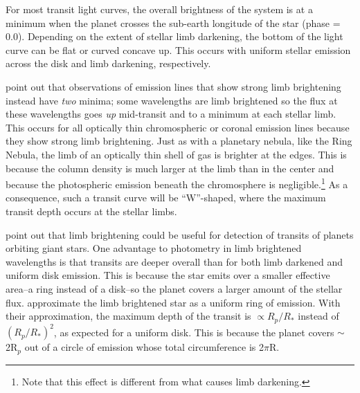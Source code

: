 \documentclass[twocolumn]{emulateapj}
\begin{document}
For most transit light curves, the overall brightness of the system is at a minimum when the planet crosses the sub-earth longitude of the star (phase = 0.0). Depending on the extent of stellar limb darkening, the bottom of the light curve can be flat or curved concave up. This occurs with uniform stellar emission across the disk and limb darkening, respectively.
%

\citet{assef} point out that observations of emission lines that show strong limb brightening instead have {\it two} minima; some
wavelengths are limb brightened so the flux at these wavelengths goes
{\it up} mid-transit and to a minimum at each stellar limb. This occurs for all optically thin
chromospheric or coronal emission lines because they show strong limb brightening. Just as with a planetary
nebula, like the Ring Nebula, the limb of an optically thin shell of
gas is brighter at the edges. This is because the column density is much larger at the limb than in the center and because the photospheric emission beneath the chromosphere is negligible.\footnote{Note
that this effect is different from what causes limb darkening.} As a
consequence, such a transit curve will be ``W''-shaped, where the maximum
transit depth occurs at the stellar limbs.

\citet{assef} point out that limb brightening could be
useful for detection of transits of planets orbiting giant stars. One advantage
to photometry in limb brightened wavelengths is that transits are
deeper overall than for both limb darkened and uniform disk
emission. This is because the star emits over a smaller effective area--a ring instead of a disk--so the planet covers a larger amount of the
stellar flux. \citet{assef} approximate the limb brightened
star as a uniform ring of emission. With their approximation, the maximum depth
of the transit is  $\propto R_p/R_*$ instead of $(R_p/R_*)^2$,
as expected for a uniform disk. This is because the planet covers $\sim$2R$_p$ out of a circle of emission whose total circumference is 2$\pi$R. 
\end{document}
